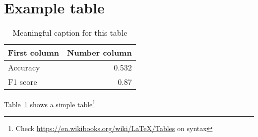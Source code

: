\section{Example table}

\begin{table}
	\centering
	\begin{tabular}{lr}
		First column & Number column \\
		\hline
		Accuracy & 0.532 \\
		F1 score & 0.87
	\end{tabular}
	\caption{Meaningful caption for this table}
	\label{tab:result}
\end{table}





Table~\ref{tab:result} shows a simple table\footnote{Check \url{https://en.wikibooks.org/wiki/LaTeX/Tables} on syntax}